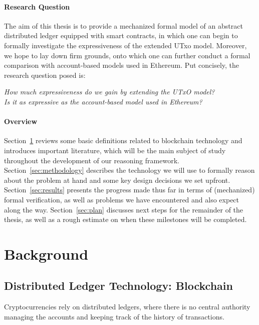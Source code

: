 \documentclass[acmsmall,nonacm=true,screen=true]{acmart}
\begin{document}
\paragraph{Research Question}
The aim of this thesis is to provide a mechanized formal model of an abstract distributed ledger equipped with
smart contracts, in which one can begin to formally investigate the expressiveness of the extended UTxo model.
Moreover, we hope to lay down firm grounds, onto which one can further conduct a formal comparison with account-based
models used in Ethereum. Put concisely, the research question posed is:
\begin{displayquote}
	\textit{How much expressiveness do we gain by extending the UTxO model?} \\
	\textit{Is it as expressive as the account-based model used in Ethereum?}
\end{displayquote}

\paragraph{Overview}
Section~\ref{sec:background} reviews some basic definitions related to blockchain
technology and introduces important literature, which will be the main subject of study
throughout the development of our reasoning framework.
Section~\ref{sec:methodology} describes the technology we will use to formally reason
about the problem at hand and some key design decisions we set upfront.
Section~\ref{sec:results} presents the progress made thus far in terms of (mechanized) formal verification,
as well as problems we have encountered and also expect along the way.
Section~\ref{sec:plan} discusses next steps for the remainder of the thesis, as well as a rough estimate
on when these milestones will be completed.

\section{Background}
\label{sec:background}


\subsection{Distributed Ledger Technology: Blockchain} \label{subsec:dlt}
Cryptocurrencies rely on distributed ledgers, where there is no central authority managing the accounts
and keeping track of the history of transactions.
\end{document}
